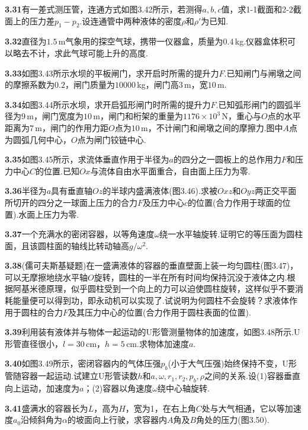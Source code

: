 \medskip
\noindent\textbf{3.31}\quad 有一差式测压管，连通方式如图3.42所示，若测得$a,b,c$值，求1-1截面和2-2截面上的压力差$p_1-p_2$.设连通管中两种液体的密度$\rho$和$\rho'$为已知.

\medskip
\noindent\textbf{3.32}\quad 直径为$1.5\,$m气象用的探空气球，携带一仪器盒，质量为$0.4\,$kg.仪器盒体积可以略去不计，求此气球可能上升的高度.

\medskip
\noindent\textbf{3.33}\quad 如图3.43所示水坝的平板闸门，求开启时所需的提升力$F$.已知闸门与闸墩之间的摩擦系数为$0.2$，闸门质量为$10000\,$kg，闸门高$3\,$m，宽$10\,$m.

\medskip
\noindent\textbf{3.34}\quad 如图3.44所示水坝，求开启弧形闸门时所需的提升力$F$.已知弧形闸门的圆弧半径为$9\,$m，闸门宽度为$10\,$m，闸门和桁架的重量为$1176\times 10^{3}\,$N，重心与$O$点的水平距离为$7\,$m，闸门的作用力距$O$点为$10\,$m，不计闸门和闸墩之间的摩擦力.图中$A$点为圆弧几何中心，$O$点为闸门铰链中心.

\medskip
\noindent\textbf{3.35}\quad 如图3.45所示，求流体垂直作用于半径为$a$的四分之一圆板上的总作用力$F$和压力中心$C$的位置.已知$Ox$与流体自由水平面重合，自由面上压力为零.

\medskip
\noindent\textbf{3.36}\quad 半径为$a$具有垂直轴$Oz$的半球内盛满液体(图3.46).求被$Oxz$和$Oyz$两正交平面所切开的四分之一球面上压力的合力$F$及压力中心$c$的位置(合力作用于球面的位置).水面上压力为零.

\medskip
\noindent\textbf{3.37}\quad 一个充满水的密闭容器，以等角速度$\omega$绕一水平轴旋转.证明它的等压面为圆柱面，且该圆柱面的轴线比转动轴高$g/\omega^{2}$.

\medskip
\noindent\textbf{3.38}\quad (儒可夫斯基疑题)在一盛满液体的容器的垂直壁面上装一均匀圆柱(图3.47)，可以无摩擦地绕水平轴$O$旋转，圆柱的一半在所有时间均保持沉没于液体之内.根据阿基米德原理，似乎圆柱受到一个向上的力可以迫使圆柱旋转，这样似乎不要消耗能量便可以得到功，即永动机可以实现了.试说明为何圆柱不会旋转？求液体作用于圆柱的合力$F$及其压力中心的位置(合力作用于圆柱表面的位置).

\medskip
\noindent\textbf{3.39}\quad 利用装有液体并与物体一起运动的U形管测量物体的加速度，如图3.48所示.U形管直径很小，$l=30\,$cm，$h=5\,$cm.求物体加速度$a$.

\medskip
\noindent\textbf{3.40}\quad 如图3.49所示，密闭容器内的气体压强$p_b$(小于大气压强)始终保持不变，U形管随容器一起运动.试建立U形管读数$h$和$a,\omega,r_1,r_2,p_b,\rho$之间的关系.设(1)容器垂直向上运动，加速度为$a$；(2)容器以角速度$\omega$绕中心轴旋转.

\medskip
\noindent\textbf{3.41}\quad 盛满水的容器长为$L$，高为$H$，宽为1，在右上角$C$处与大气相通，它以等加速度$a_0$沿倾斜角为$\alpha$的坡面向上行驶，求容器内$A$角及$B$角处的压力(图3.50).

